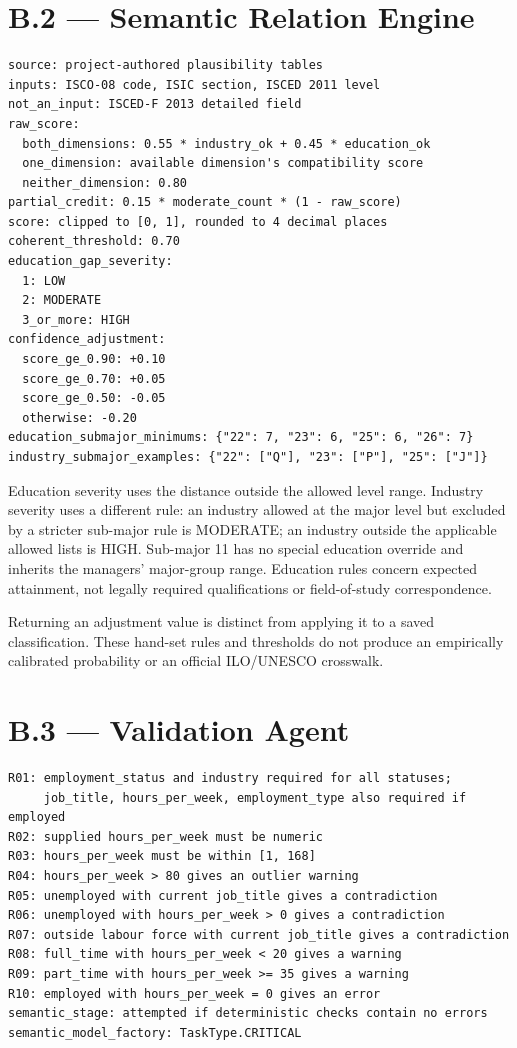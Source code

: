 \section*{B.2 --- Semantic Relation Engine}
\begin{lstlisting}[caption={Implemented coherence rules and score settings.}]
source: project-authored plausibility tables
inputs: ISCO-08 code, ISIC section, ISCED 2011 level
not_an_input: ISCED-F 2013 detailed field
raw_score:
  both_dimensions: 0.55 * industry_ok + 0.45 * education_ok
  one_dimension: available dimension's compatibility score
  neither_dimension: 0.80
partial_credit: 0.15 * moderate_count * (1 - raw_score)
score: clipped to [0, 1], rounded to 4 decimal places
coherent_threshold: 0.70
education_gap_severity:
  1: LOW
  2: MODERATE
  3_or_more: HIGH
confidence_adjustment:
  score_ge_0.90: +0.10
  score_ge_0.70: +0.05
  score_ge_0.50: -0.05
  otherwise: -0.20
education_submajor_minimums: {"22": 7, "23": 6, "25": 6, "26": 7}
industry_submajor_examples: {"22": ["Q"], "23": ["P"], "25": ["J"]}
\end{lstlisting}

Education severity uses the distance outside the allowed level range.
Industry severity uses a different rule: an industry allowed at the major
level but excluded by a stricter sub-major rule is MODERATE; an industry
outside the applicable allowed lists is HIGH. Sub-major 11 has no special
education override and inherits the managers' major-group range.
Education rules concern expected attainment, not legally required
qualifications or field-of-study correspondence.

Returning an adjustment value is distinct from applying it to a saved
classification. These hand-set rules and thresholds do not produce an
empirically calibrated probability or an official ILO/UNESCO crosswalk.

\section*{B.3 --- Validation Agent}
\begin{lstlisting}[caption={Validation rules and semantic stage.}]
R01: employment_status and industry required for all statuses;
     job_title, hours_per_week, employment_type also required if employed
R02: supplied hours_per_week must be numeric
R03: hours_per_week must be within [1, 168]
R04: hours_per_week > 80 gives an outlier warning
R05: unemployed with current job_title gives a contradiction
R06: unemployed with hours_per_week > 0 gives a contradiction
R07: outside labour force with current job_title gives a contradiction
R08: full_time with hours_per_week < 20 gives a warning
R09: part_time with hours_per_week >= 35 gives a warning
R10: employed with hours_per_week = 0 gives an error
semantic_stage: attempted if deterministic checks contain no errors
semantic_model_factory: TaskType.CRITICAL
\end{lstlisting}


